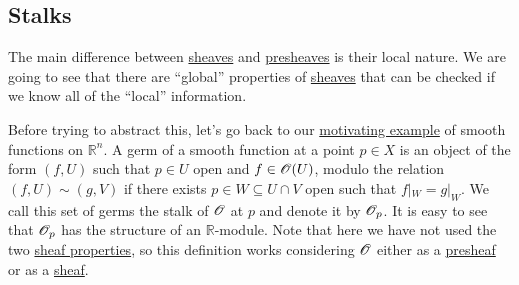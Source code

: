 \documentclass[../../main]{subfiles}
\begin{document}
\subsection{Stalks}

The main difference between \hyperref[def:sheaf]{sheaves} and \hyperref[def:presheaf]{presheaves} is their local nature.
We are going to see that there are ``global'' properties of \hyperref[def:sheaf]{sheaves} that can be checked if we know all of the ``local'' information.

Before trying to abstract this, let's go back to our \hyperref[sec:motivating-example-sheaves]{motivating example} of smooth functions on \(\mathbb{R}^{n}\).
A germ of a smooth function at a point \(p \in X\) is an object of the form \((f, U)\) such that \(p \in U\) open and \(f \in \mathscr{O}(U)\), modulo the relation \((f, U) \sim (g, V)\) if there exists \(p \in W \subseteq U \cap V\) open such that \(f|_{W} = g|_{W}\).
We call this set of germs the stalk of \(\mathscr{O}\) at \(p\) and denote it by \(\mathscr{O}_{p}\).
It is easy to see that \(\mathscr{O}_{p}\) has the structure of an \(\mathbb{R}\)-module.
Note that here we have not used the two \hyperref[def:sheaf]{sheaf properties}, so this definition works considering \(\mathscr{O}\) either as a \hyperref[def:presheaf]{presheaf} or as a \hyperref[def:sheaf]{sheaf}.
\end{document}
